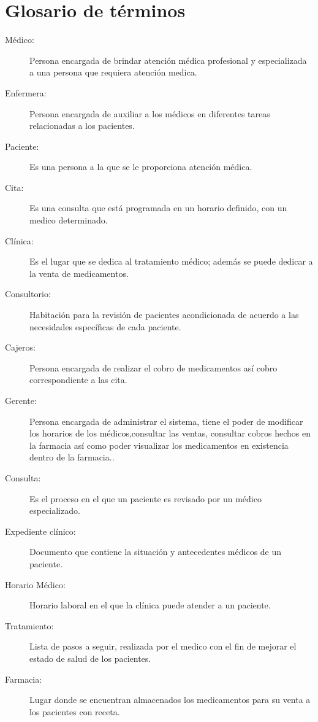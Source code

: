 \section{Glosario de términos}
\begin{description}
\item [Médico:] Persona encargada de brindar atención médica profesional y especializada a una persona que requiera atención medica.
\item [Enfermera:] Persona encargada de auxiliar a los médicos en diferentes tareas relacionadas a los pacientes. 
\item [Paciente:] Es una persona a la que se le proporciona atención médica. 
\item [Cita:] Es una consulta que está programada en un horario definido, con un medico determinado.
\item [Clínica:] Es el lugar que se dedica al tratamiento médico; además se puede dedicar a la venta de medicamentos.
\item [Consultorio:] Habitación para la revisión de pacientes acondicionada de acuerdo a las necesidades específicas de cada paciente.
\item [Cajeros:] Persona encargada de realizar el cobro de medicamentos así cobro correspondiente a las cita.
\item [Gerente:] Persona encargada de administrar el sistema, tiene el poder de modificar los horarios de los médicos,consultar las ventas, consultar cobros hechos en la farmacia así como poder visualizar los medicamentos en existencia dentro de la farmacia..
\item [Consulta:] Es el proceso en el que un paciente es revisado por un médico especializado. 
\item [Expediente clínico:] Documento que contiene la situación y antecedentes médicos de un paciente.
\item [Horario Médico:] Horario laboral en el que la clínica puede atender a un paciente.
\item [Tratamiento:] Lista de pasos a seguir, realizada por el medico con el fin de mejorar el estado de salud de los pacientes.
\item [Farmacia:] Lugar donde se encuentran almacenados los medicamentos para su venta a los pacientes con receta.
\end{description}

